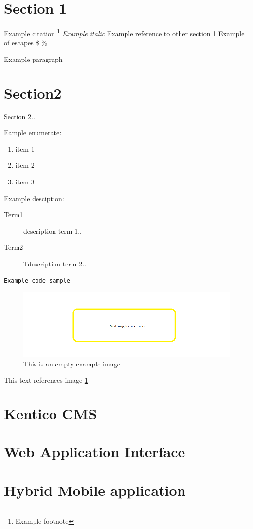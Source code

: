 \section{Section 1}\label{section1}
Example citation\cite{exampleArticle}
\footnote{Example footnote}
\textit{Example italic}
Example reference to other section \ref{section1}
Example of escapes \$ \% \- 

Example paragraph

\section{Section2} \label{section2}
Section 2...


Eample enumerate: \begin{enumerate}
\item item 1
\item item 2
\item item 3
\end{enumerate}

Example desciption:

\begin{description}
\item [Term1] \label{term1}description term 1..
\item [Term2] \label{term2}Tdescription term 2..
\end{description}

\lstset{style=sharpc}
\begin{lstlisting}
Example code sample
\end{lstlisting}

\begin{figure}[ht!]
  \centering
  \includegraphics[width=\textwidth]{Images/empty.png}
  \caption{This is an empty example image}
  \label{ExampleImage1}
\end{figure}

This text references image \ref{ExampleImage1}

\section{Kentico CMS} \label{analysisKenticoCMS}

\section{Web Application Interface} \label{analysisWebAPI}
\section{Hybrid Mobile application} \label{analysisHybridMobileApplication}
